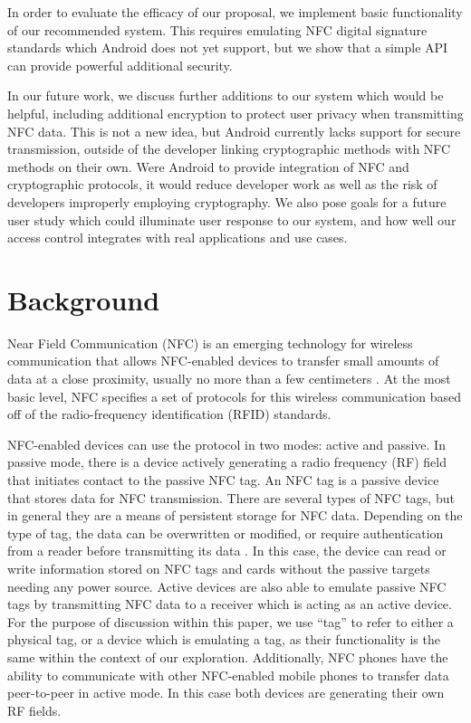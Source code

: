 \documentclass[12pt]{article}
\begin{document}
In order to evaluate the efficacy of our proposal, we implement basic functionality of our recommended system.
This requires emulating NFC digital signature standards which Android does not yet support, but we show that a simple API can provide powerful additional security.

In our future work, we discuss further additions to our system which would be helpful, including additional encryption to protect user privacy when transmitting NFC data.
This is not a new idea, but Android currently lacks support for secure transmission, outside of the developer linking cryptographic methods with NFC methods on their own.
Were Android to provide integration of NFC and cryptographic protocols, it would reduce developer work as well as the risk of developers improperly employing cryptography.
We also pose goals for a future user study which could illuminate user response to our system, and how well our access control integrates with real applications and use cases.

\section{Background}
Near Field Communication (NFC) is an emerging technology for wireless communication that allows NFC-enabled devices to transfer small amounts of data at a close proximity, usually no more than a few centimeters \cite{nfcip-1, nfcip-2}.
At the most basic level, NFC specifies a set of protocols for this wireless communication based off of the radio-frequency identification (RFID) standards.

NFC-enabled devices can use the protocol in two modes: active and passive.
In passive mode, there is a device actively generating a radio frequency (RF) field that initiates contact to the passive NFC tag.
An NFC tag is a passive device that stores data for NFC transmission.
There are several types of NFC tags, but in general they are a means of persistent storage for NFC data.
Depending on the type of tag, the data can be overwritten or modified, or require authentication from a reader before transmitting its data \cite{koninggans2008}.
In this case, the device can read or write information stored on NFC tags and cards without the passive targets needing any power source.
Active devices are also able to emulate passive NFC tags by transmitting NFC data to a receiver which is acting as an active device.
For the purpose of discussion within this paper, we use ``tag'' to refer to either a physical tag, or a device which is emulating a tag, as their functionality is the same within the context of our exploration.
Additionally, NFC phones have the ability to communicate with other NFC-enabled mobile phones to transfer data peer-to-peer in active mode.
In this case both devices are generating their own RF fields.
\end{document}
